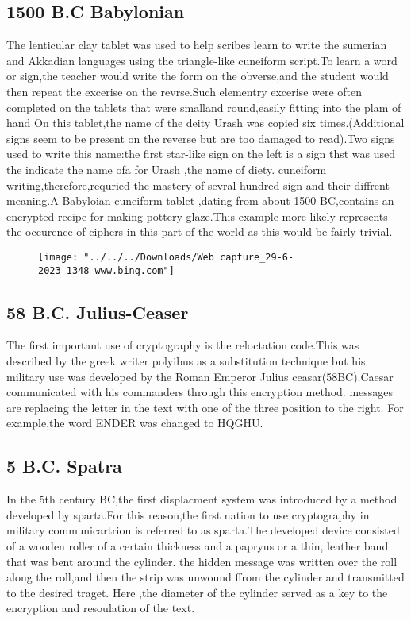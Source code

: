 \documentclass[12pt,a4paper]{article}
\begin{document}
	\subsection{1500 B.C Babylonian}
	The lenticular clay tablet was used to help scribes learn to write the sumerian and Akkadian languages using the triangle-like cuneiform script.To learn a word or sign,the teacher would write the form on the obverse,and the student would then repeat the excerise on the revrse.Such elementry excerise were often completed on the tablets that were smalland round,easily fitting into the plam of hand
	\newline  On this tablet,the name of the deity Urash was copied six times.(Additional signs seem to be present on the reverse but are too damaged to read).Two signs used to write this name:the first star-like sign on the left is a sign thst was used the indicate the name ofa for Urash ,the name of diety.
	cuneiform writing,therefore,requried the mastery of sevral hundred sign and their diffrent meaning.A Babyloian cuneiform tablet ,dating from about 1500 BC,contains an encrypted recipe for making pottery glaze.This example more likely represents the occurence of ciphers in this part of the world as this would be fairly trivial.
	\begin{figure}[h]
		\centering
		\texttt{[image: "../../../Downloads/Web capture\_29-6-2023\_1348\_www.bing.com"]}
		\caption{}
		\label{Babylonian}
	\end{figure}
	
	\subsection{58 B.C. Julius-Ceaser}
	The first important use of cryptography is the reloctation code.This was described by the greek writer polyibus as a substitution technique but his military use was developed by the Roman Emperor Julius ceasar(58BC).Caesar communicated with his commanders through this encryption method. messages are replacing the letter in the text with one of the three position to the right. For example,the word ENDER was changed to HQGHU.
	\subsection{5 B.C. Spatra}
	In the 5th century BC,the first displacment system was introduced by a method developed by sparta.For this reason,the first nation to use cryptography in military communicartrion is referred to as sparta.The developed device consisted of a wooden roller of a certain thickness and a papryus or a thin, leather band that was bent around the cylinder. the hidden message was written over the roll along the roll,and then the strip was unwound ffrom the cylinder and transmitted to the desired traget. Here ,the diameter of the cylinder served as a key to the encryption and resoulation of the text.
	
\end{document}
